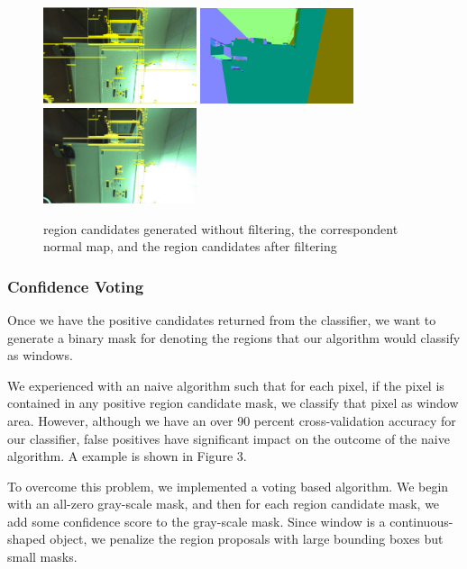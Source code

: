 \documentclass[10pt,twocolumn,letterpaper]{article}
\begin{document}
\begin{figure}
\begin{center}
\includegraphics[width=0.4\textwidth,angle=90]{plots/303wo.png}
\includegraphics[width=0.4\textwidth,angle=90]{plots/normal.png}
\includegraphics[width=0.4\textwidth,angle=90]{plots/303w.png}
\end{center}
\caption{region candidates generated without filtering, the correspondent normal map, and the region candidates after filtering}
\end{figure}

\subsubsection{Confidence Voting}
Once we have the positive candidates returned from the classifier, we want to generate a binary mask for denoting the regions that our algorithm would classify as windows. 

We experienced with an naive algorithm such that for each pixel, if the pixel is contained in any positive region candidate mask, we classify that pixel as window area. However, although we have an over 90 percent cross-validation accuracy for our classifier, false positives have significant impact on the outcome of the naive algorithm. A example is shown in Figure 3.

To overcome this problem, we implemented a voting based algorithm. We begin with an all-zero gray-scale mask, and then for each region candidate mask, we add some confidence score to the gray-scale mask. Since window is a continuous-shaped object, we penalize the region proposals with large bounding boxes but small masks.
\end{document}
